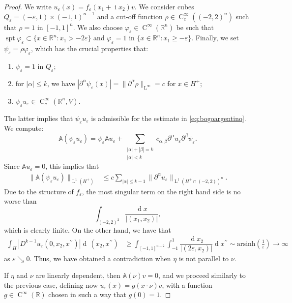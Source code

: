 \documentclass[a4paper,10pt]{amsart}
\newcommand{\R}{\mathbb R}
\renewcommand{\leq}{\leqslant}
\newcommand{\dif}{\mathrm{d}}
\renewcommand{\dif}{\operatorname{d}\!}
\newcommand{\lebe}{\operatorname{L}}
\newcommand{\imag}{\operatorname{i}}
\newcommand{\hold}{\operatorname{C}}
\newcommand{\A}{\mathbb{A}}
\newcommand{\spt}{\operatorname{spt}}
\numberwithin{equation}{section}
\theoremstyle{remark}
\numberwithin{equation}{section}
\begin{document}
\begin{proof}
		We write $u_\varepsilon(x)=f_\varepsilon(x_1+\imag x_2)v$. We consider cubes $Q_\varepsilon=(-\varepsilon,1)\times(-1,1)^{n-1}$ and a cut-off function $\rho\in\hold^\infty_c((-2,2)^n)$ such that $\rho=1$ in $[-1,1]^n$. We also choose $\varphi_\varepsilon\in\hold^\infty(\R^n)$ be such that $\spt\varphi_\varepsilon\subset\{x\in\R^n\colon x_1>-2\varepsilon\}$ and $\varphi_\varepsilon=1$ in $\{x\in\R^n\colon x_1\geq-\varepsilon\}$. Finally, we set $\psi_\varepsilon=\rho\varphi_\varepsilon$, which has the crucial properties that:
		\begin{enumerate}
			\item[(i)] $\psi_\varepsilon=1$ in $Q_\varepsilon$;
			\item[(ii)] for $|\alpha|\leq k$, we have $|\partial^\alpha\psi_\varepsilon(x)|= \|\partial^\alpha \rho\|_{\lebe^\infty}=c$ for $x\in H^+$;
			\item[(iii)] $\psi_\varepsilon u_\varepsilon\in\hold^\infty_c(\R^n,V)$.
		\end{enumerate}
		The latter implies that $\psi_\varepsilon u_\varepsilon$ is admissible for the estimate in \eqref{eq:bogoargentino}. We compute:
		$$
		\A(\psi_\varepsilon u_\varepsilon)=\psi_\varepsilon \A u_\varepsilon+\sum_{\substack{|\alpha| + |\beta|=k\\ \vert \alpha \vert < k}}c_{\alpha,\beta}\partial^\alpha u_\varepsilon\partial^\beta \psi_\varepsilon.
		$$
		Since $\A u_{\varepsilon}=0$, this implies that
		\begin{align*}
			\|\A(\psi_\varepsilon u_\varepsilon)\|_{\lebe^1(H^+)}&\leq c\sum_{|\alpha|\leq k-1}\|\partial^\alpha u_\varepsilon\|_{\lebe^1(H^+\cap(-2,2))^n}.
		\end{align*}
		Due to the structure of $f_\varepsilon$, the most singular term on the right hand side is no worse than
		$$
		\int_{(-2,2)^2}\dfrac{\dif x}{|(x_1,x_2)|},
		$$
		which is clearly finite. On the other hand, we have that
		\begin{align*}
			\int_H |D^{k-1}u_\varepsilon(0,x_2,x^{\prime\prime})|\dif\,(x_2,x^{\prime\prime})&\geq \int_{[-1,1]^{n-2}}\int_{-1}^1\dfrac{\dif x_2}{|(2\varepsilon,x_2)|}\dif x^{\prime\prime}\sim\mathrm{arsinh}(\tfrac{1}{\varepsilon}) \to \infty
		\end{align*}
		as $\varepsilon\searrow0$. Thus, we have obtained a contradiction when $\eta$ is not parallel to $\nu$.
		
		\medbreak
		
		If $\eta$ and $\nu$ are linearly dependent, then \(\A(\nu)v = 0\), and we proceed similarly to the previous case, defining now \(u_\varepsilon (x) = g(x \cdot \nu) v\), with a function \(g \in \hold^\infty (\R)\) chosen in such a way that \(g (0) = 1\).
	\end{proof}
	
\end{document}
